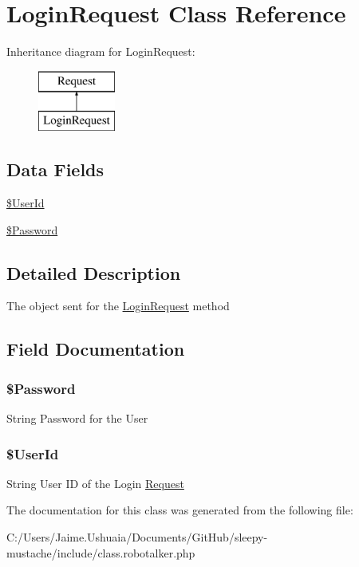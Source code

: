 \hypertarget{class_login_request}{\section{Login\-Request Class Reference}
\label{class_login_request}
}
Inheritance diagram for Login\-Request\-:\begin{figure}[H]
\begin{center}
\leavevmode
\includegraphics[height=2.000000cm]{class_login_request}
\end{center}
\end{figure}
\subsection*{Data Fields}
\begin{DoxyCompactItemize}
\item 
\hyperlink{class_login_request_a5e6181896c4104715348824d02a3075d}{\$\-User\-Id}
\item 
\hyperlink{class_login_request_ae3ac8512c0fd8924c7112671ead08cf7}{\$\-Password}
\end{DoxyCompactItemize}


\subsection{Detailed Description}
The object sent for the \hyperlink{class_login_request}{Login\-Request} method 

\subsection{Field Documentation}
\hypertarget{class_login_request_ae3ac8512c0fd8924c7112671ead08cf7}{
\subsubsection[{\$\-Password}]{\setlength{\rightskip}{0pt plus 5cm}\$Password}}\label{class_login_request_ae3ac8512c0fd8924c7112671ead08cf7}
String Password for the User \hypertarget{class_login_request_a5e6181896c4104715348824d02a3075d}{
\subsubsection[{\$\-User\-Id}]{\setlength{\rightskip}{0pt plus 5cm}\$User\-Id}}\label{class_login_request_a5e6181896c4104715348824d02a3075d}
String User I\-D of the Login \hyperlink{class_request}{Request} 

The documentation for this class was generated from the following file\-:\begin{DoxyCompactItemize}
\item 
C\-:/\-Users/\-Jaime.\-Ushuaia/\-Documents/\-Git\-Hub/sleepy-\/mustache/include/class.\-robotalker.\-php\end{DoxyCompactItemize}
